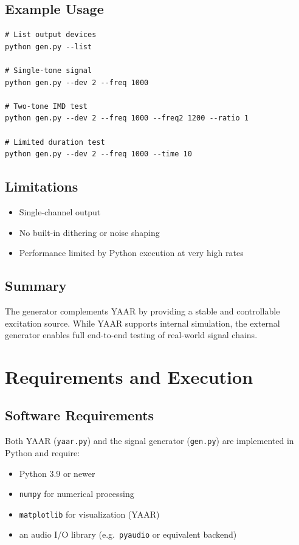 \documentclass[conference]{IEEEtran}
\begin{document}
\subsection{Example Usage}
\begin{lstlisting}[style=shellstyle]
# List output devices
python gen.py --list

# Single-tone signal
python gen.py --dev 2 --freq 1000

# Two-tone IMD test
python gen.py --dev 2 --freq 1000 --freq2 1200 --ratio 1

# Limited duration test
python gen.py --dev 2 --freq 1000 --time 10
\end{lstlisting}

\subsection{Limitations}
\begin{itemize}[leftmargin=*,nosep]
    \item Single-channel output
    \item No built-in dithering or noise shaping
    \item Performance limited by Python execution at very high rates
\end{itemize}

\subsection{Summary}
The generator complements YAAR by providing a stable and controllable excitation source. While YAAR supports internal simulation, the external generator enables full end-to-end testing of real-world signal chains.

\section{Requirements and Execution}

\subsection{Software Requirements}
Both YAAR (\texttt{yaar.py}) and the signal generator (\texttt{gen.py}) are implemented in Python and require:

\begin{itemize}[leftmargin=*,nosep]
    \item Python 3.9 or newer
    \item \texttt{numpy} for numerical processing
    \item \texttt{matplotlib} for visualization (YAAR)
    \item an audio I/O library (e.g.\ \texttt{pyaudio} or equivalent backend)
\end{itemize}
\end{document}
